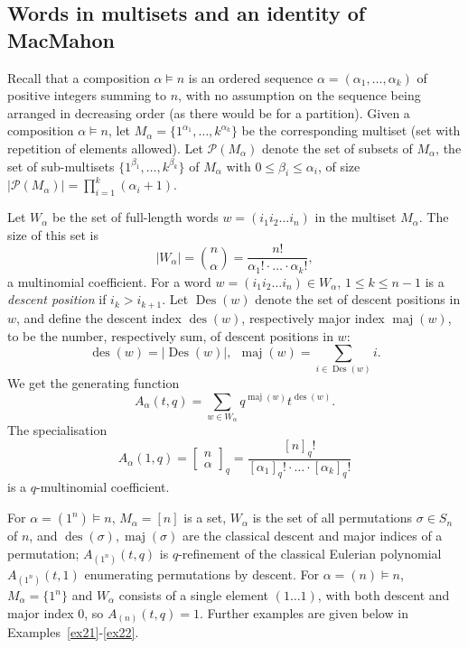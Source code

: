 \documentclass[a4paper,11pt]{amsart}
\theoremstyle{plain}
\theoremstyle{definition}
\DeclareMathOperator{\maj}{maj}
\DeclareMathOperator{\des}{des}
\DeclareMathOperator{\Des}{Des}
\begin{document}
\subsection{Words in multisets and an identity of MacMahon} \label{subsec:multi}
Recall that a composition $\alpha \vDash n$ is an ordered sequence $\alpha=(\alpha_1, \ldots, \alpha_k)$ of positive integers summing to $n$, with no assumption on the sequence being arranged in decreasing order (as there would be for a partition). 
Given a composition $\alpha \vDash n$, let $M_\alpha=\{1^{\alpha_1}, \ldots, k^{\alpha_k}\}$ be the corresponding multiset (set with repetition of elements allowed). Let ${\mathcal P}(M_\alpha)$ denote the set of subsets of $M_\alpha$, the set of sub-multisets $\{1^{\beta_1}, \ldots, k^{\beta_k}\}$ of $M_\alpha$ with $0\leq \beta_i\leq\alpha_i$, of size $|{\mathcal P}(M_\alpha)|=\prod_{i=1}^k (\alpha_i+1)$. 

Let $W_\alpha$ be the set of full-length words $w=(i_1i_2\ldots i_n)$ in the multiset $M_\alpha$. The size of this set is 
\[|W_\alpha| = {n\choose \alpha} = \frac{n!}{\alpha_1!\cdot\ldots\cdot\alpha_k!},\]
a multinomial coefficient. For a word $w=(i_1i_2\ldots i_n)\in W_\alpha$, $1\leq k \leq n-1$ is a {\em descent position} if $i_k>i_{k+1}$. Let $\Des(w)$ denote the set of descent positions in $w$, and define the descent index $\des(w)$, respectively major index $\maj(w)$, to be the number, respectively sum, of descent positions in $w$:
\[ \des(w) = |\Des(w)|, \ \ \maj(w) = \sum_{i\in \Des(w)}i.\]
We get the generating function
\[
A_\alpha(t,q) = \sum_{w\in W_\alpha} q^{\maj(w)}t^{\des(w)}.
\]
The specialisation
\[
A_\alpha(1,q) =\left[\!\!\begin{array}{c}n\\\alpha\end{array}\!\!\right]_q = \frac{[n]_q!}{[\alpha_1]_q!\cdot\ldots\cdot[\alpha_k]_q!}
\]
is a $q$-multinomial coefficient. 

For $\alpha=(1^n)\vDash n$, $M_\alpha=[n]$ is a set, $W_\alpha$ is the set of all permutations $\sigma\in S_n$ of $n$, and $\des(\sigma), \maj(\sigma)$ are the classical descent and major indices of a permutation; $A_{(1^n)}(t,q)$ is $q$-refinement of the classical Eulerian polynomial $A_{(1^n)}(t,1)$ enumerating permutations by descent. For $\alpha=(n)\vDash n$, $M_\alpha=\{1^n\}$ and $W_\alpha$ consists of a single element $(1\ldots 1)$, with both descent and major index $0$, so $A_{(n)}(t,q)=1$. Further examples are given below in Examples~\ref{ex21}-\ref{ex22}.
\end{document}
